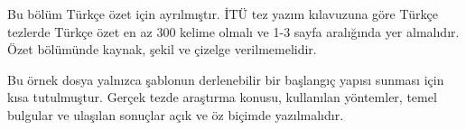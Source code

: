 Bu bölüm Türkçe özet için ayrılmıştır. İTÜ tez yazım kılavuzuna göre Türkçe
tezlerde Türkçe özet en az 300 kelime olmalı ve 1-3 sayfa aralığında yer
almalıdır. Özet bölümünde kaynak, şekil ve çizelge verilmemelidir.

Bu örnek dosya yalnızca şablonun derlenebilir bir başlangıç yapısı sunması için
kısa tutulmuştur. Gerçek tezde araştırma konusu, kullanılan yöntemler, temel
bulgular ve ulaşılan sonuçlar açık ve öz biçimde yazılmalıdır.
